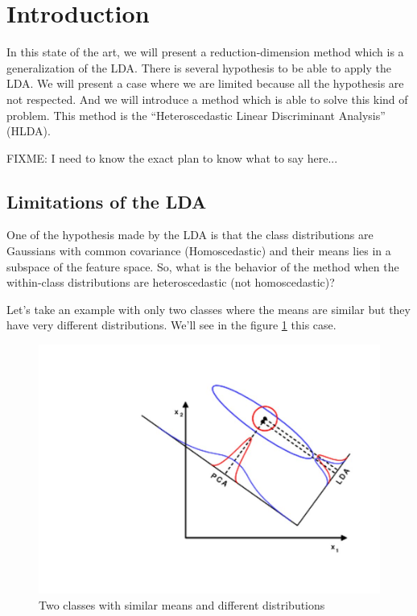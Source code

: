 
\section{Introduction}
\label{sec:introduction}

In this state of the art, we will present a reduction-dimension method
which is a generalization of the LDA. There is several hypothesis to
be able to apply the LDA. We will present a case where we are
limited because all the hypothesis are not respected. And we will
introduce a method which is able to solve this kind of problem. This
method is the ``Heteroscedastic Linear Discriminant Analysis'' (HLDA).

FIXME: I need to know the exact plan to know what to say here...

\subsection{Limitations of the LDA}
\label{sec:limitations-lda}

One of the hypothesis made by the LDA is that the class distributions
are Gaussians with common covariance (Homoscedastic) and their means
lies in a subspace of the feature space. So, what is the behavior of
the method when the within-class distributions are heteroscedastic
(not homoscedastic)?

Let's take an example with only two classes where the means are
similar but they have very different distributions. We'll see in the
figure \ref{fig:lda-fail} this case.

\begin{figure}[h]
  \centering
  \includegraphics[scale=0.5]{img/limitation_lda}
  \caption{Two classes with similar means and different distributions}
  \label{fig:lda-fail}
\end{figure}

